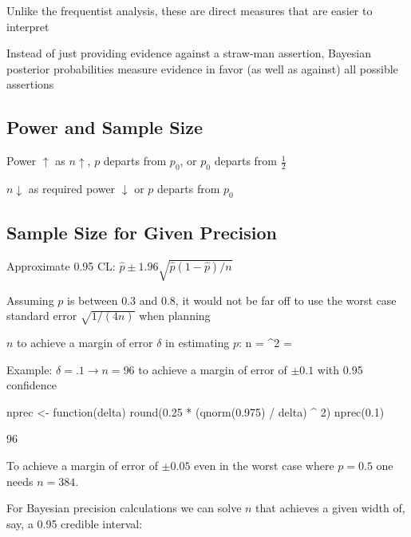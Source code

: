 \item Unlike the frequentist analysis, these are direct measures that are
easier to interpret
\item Instead of just providing evidence against a
straw-man assertion, Bayesian posterior probabilities measure evidence
in favor (as well as against) all possible assertions
\ei

\subsection{Power and Sample Size}
\bi
\item Power $\uparrow$ as $n \uparrow$, $p$ departs from $p_{0}$, or
  $p_{0}$ departs from $\frac{1}{2}$
\item $n \downarrow$ as required power $\downarrow$ or $p$ departs
  from $p_{0}$
\ei

\subsection{Sample Size for Given Precision}
\bi
\item Approximate 0.95 CL: $\hat{p} \pm 1.96
  \sqrt{\hat{p}(1-\hat{p})/n}$
\item Assuming $p$ is between 0.3 and 0.8, it would not be far off to
  use the worst case standard error $\sqrt{1/(4n)}$ when planning
\item $n$ to achieve a margin of error $\delta$ in estimating $p$: 
\beq
n = ^{2} = 
\eeq
\item Example: $\delta=.1 \rightarrow n=96$ to achieve a margin of error of
  $\pm 0.1$ with 0.95 confidence
\ei
\begin{Schunk}
\begin{Sinput}
nprec <- function(delta) round(0.25 * (qnorm(0.975) / delta) ^ 2)
nprec(0.1)
\end{Sinput}
\begin{Soutput}
[1] 96
\end{Soutput}
\end{Schunk}

To achieve a margin of error of $\pm 0.05$ even in the worst case where
$p=0.5$ one needs $n=384$.

For Bayesian precision calculations we can solve $n$ that achieves a
given width of, say, a 0.95 credible interval:

